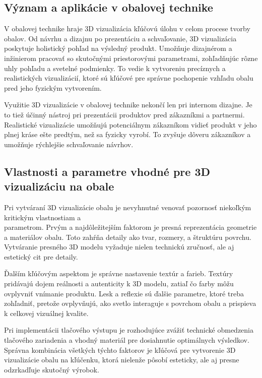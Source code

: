     \subsection{Význam a aplikácie v obalovej technike}
      V obalovej technike hraje 3D vizualizácia kľúčovú úlohu v celom procese tvorby obalov. Od návrhu a dizajnu po prezentáciu a schvaľovanie, 3D vizualizácia poskytuje holistický pohľad na výsledný produkt. Umožňuje dizajnérom a inžinierom pracovať so skutočnými priestorovými parametrami, zohľadňujúc rôzne uhly pohľadu a svetelné podmienky. To vedie k vytvoreniu precíznych a realistických vizualizácií, ktoré sú kľúčové pre správne pochopenie vzhľadu obalu pred jeho fyzickým vytvorením.

Využitie 3D vizualizácie v obalovej technike nekončí len pri internom dizajne. Je to tiež účinný nástroj pri prezentácii produktov pred zákazníkmi a partnermi. Realistické vizualizácie umožňujú potenciálnym zákazníkom vidieť produkt v jeho plnej kráse ešte predtým, než sa fyzicky vyrobí. To zvyšuje dôveru zákazníkov a umožňuje rýchlejšie schvaľovanie návrhov.

    \subsection{Vlastnosti a parametre vhodné pre 3D vizualizáciu na obale}
      Pri vytváraní 3D vizualizácie obalu je nevyhnutné venovať pozornosť niekoľkým kritickým vlastnostiam a \\ parametrom. Prvým a najdôležitejším faktorom je presná reprezentácia geometrie a materiálov obalu. Toto zahŕňa detaily ako tvar, rozmery, a štruktúru povrchu. Vytváranie presného 3D modelu vyžaduje nielen technickú zručnosť, ale aj estetický cit pre detaily.

      Ďalším kľúčovým aspektom je správne nastavenie textúr a farieb. Textúry pridávajú dojem reálnosti a autenticity k 3D modelu, zatiaľ čo farby môžu ovplyvniť vnímanie produktu. Lesk a reflexie sú ďalšie parametre, ktoré treba zohľadniť, pretože ovplyvňujú, ako svetlo interaguje s povrchom obalu a prispieva k celkovej vizuálnej kvalite.

      Pri implementácii tlačového výstupu je rozhodujúce zvážiť technické obmedzenia tlačového zariadenia a vhodný materiál pre dosiahnutie optimálnych výsledkov. Správna kombinácia všetkých týchto faktorov je kľúčová pre vytvorenie 3D vizualizácie obalu na kľúčenku, ktorá nielenže pôsobí esteticky, ale aj presne odzrkadľuje skutočný výrobok.

